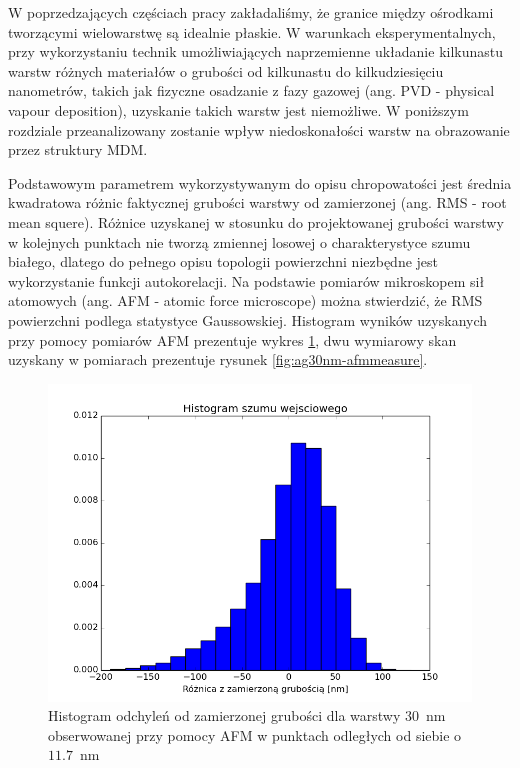 W poprzedzających częściach pracy zakładaliśmy, że granice między ośrodkami tworzącymi wielowarstwę są idealnie płaskie. W warunkach eksperymentalnych, przy wykorzystaniu technik umożliwiających naprzemienne układanie kilkunastu warstw różnych materiałów o grubości od kilkunastu do kilkudziesięciu nanometrów,  takich jak fizyczne osadzanie z fazy gazowej (ang. PVD - physical vapour deposition), uzyskanie takich warstw jest niemożliwe. W poniższym rozdziale przeanalizowany zostanie wpływ niedoskonałości warstw na obrazowanie przez struktury MDM.

Podstawowym parametrem wykorzystywanym do opisu chropowatości jest średnia kwadratowa różnic faktycznej grubości warstwy od zamierzonej (ang. RMS - root mean squere). Różnice uzyskanej w stosunku do projektowanej grubości warstwy w kolejnych punktach nie tworzą zmiennej losowej o charakterystyce szumu białego, dlatego do pełnego opisu topologii powierzchni niezbędne jest wykorzystanie funkcji autokorelacji\cite{stefaniuk2011effect}. Na podstawie pomiarów mikroskopem sił atomowych (ang. AFM - atomic force microscope) można stwierdzić, że RMS powierzchni podlega statystyce Gaussowskiej. Histogram wyników uzyskanych przy pomocy pomiarów AFM prezentuje wykres \ref{fig:ag30nm-afmhist}, dwu wymiarowy skan uzyskany w pomiarach prezentuje rysunek \ref{fig:ag30nm-afmmeasure}.

\begin{figure}[bt]
		\includegraphics[width=\textwidth]{images/multilayer/ag30nm-afm-measure-hist.png}
		\caption{Histogram odchyleń od zamierzonej grubości dla warstwy $30$~nm obserwowanej przy pomocy AFM w punktach odległych od siebie o $11.7$~nm} 		\label{fig:ag30nm-afmhist}
\end{figure}

